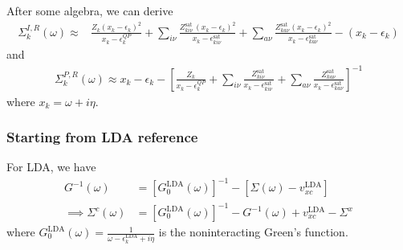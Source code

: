 After some algebra, we can derive 
\begin{align}
    \Sigma_k^{I, R}(\omega) \approx & \frac{Z_k\left(x_k-\epsilon_k\right)^2}{x_k-\epsilon_k^{Q P}} +\sum_{i \nu} \frac{Z_{k i \nu}^{\text {sat }}\left(x_k-\epsilon_k\right)^2}{x_k-\epsilon_{k i \nu}^{\text {sat }}}+\sum_{a \nu} \frac{Z_{k a \nu}^{\text {sat }}\left(x_k-\epsilon_k\right)^2}{x_k-\epsilon_{k a \nu}^{\text {sat }}} -\left(x_k-\epsilon_k\right)
\end{align}
and
\begin{align}
    \Sigma_k^{P, R}(\omega) \approx x_k-\epsilon_k-\left[\frac{Z_k}{x_k-\epsilon_k^{Q P}}+\sum_{i \nu} \frac{Z_{k i \nu}^{\text {sat }}}{x_k-\epsilon_{k i \nu}^{\text {sat }}}+\sum_{a \nu} \frac{Z_{k a \nu}^{\text {sat }}}{x_k-\epsilon_{k a \nu}^{\text {sat }}}\right]^{-1}
\end{align}
where $x_k = \omega + i\eta$.
\subsubsection{Starting from LDA reference}
For LDA, we have 
\begin{align}
    G^{-1}(\omega)&=\left[G_0^{\mathrm{LDA}}(\omega)\right]^{-1}-\left[\Sigma(\omega)-v_{x c}^{\mathrm{LDA}}\right]\\
\implies \Sigma^c(\omega) &= \left[G_0^{\mathrm{LDA}}(\omega)\right]^{-1}-G^{-1}(\omega) + v_{x c}^{\mathrm{LDA}} - \Sigma^x
\end{align}
where $G_0^{\mathrm{LDA}}(\omega) = \frac{1}{\omega - \epsilon_k^{\mathrm{LDA}} + i\eta}$ is the noninteracting Green's function. 

